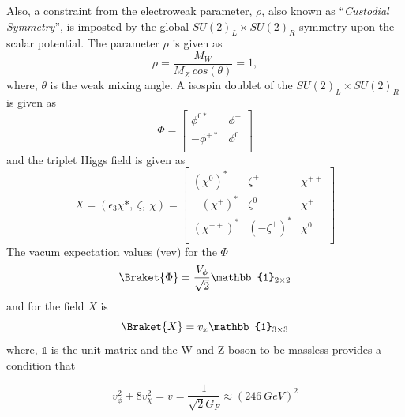 Also, a constraint from the electroweak parameter, $\rho$, also known as ``\textit{Custodial Symmetry}'', is imposted by the global $SU(2)_L \times SU(2)_R$ symmetry upon the scalar potential. The parameter $\rho$ is given as
\begin{equation}
    \rho = \frac{M_W}{M_Z ~ cos(\theta)} = 1,
\end{equation}
where, $\theta$ is the weak mixing angle.
A isospin doublet of the $SU(2)_L \times SU(2)_R$ is given as
\begin{equation}
    \Phi = 
    \begin{bmatrix}
        \phi^{0*} &  \phi^+ \\
        -\phi^{+*} & \phi^0 \\
    \end{bmatrix}
\end{equation}
and the triplet  Higgs field is given as
\begin{equation}
    X = (\epsilon_3 \chi*,~\zeta,~\chi) = 
    \begin{bmatrix}
        (\chi^0)^*     &   \zeta^+     &   \chi^{++} \\
        -(\chi^{+})^*    &   \zeta^0     &   \chi^+    \\
        (\chi^{++})^*  &   (-\zeta^+)^*   &   \chi^0    \\
    \end{bmatrix}
\end{equation}
The vacum expectation values (vev) for the $\Phi$
\begin{equation}
    \Braket{\Phi} = \frac{V_\phi}{\sqrt{2}} \mathbb{1}_{2\times 2}
\end{equation}
and for the field $X$ is 
\begin{equation}
    \Braket{X}  = v_x \mathbb{1}_{3\times 3}
\end{equation}
where, $\mathbb{1}$ is the unit matrix and the W and Z boson to be massless provides a condition that

\begin{equation}
    v_\phi^2 + 8v_{\chi}^2 = v = \frac{1}{\sqrt{2}G_F} \approx (246~GeV)^2
\end{equation}

